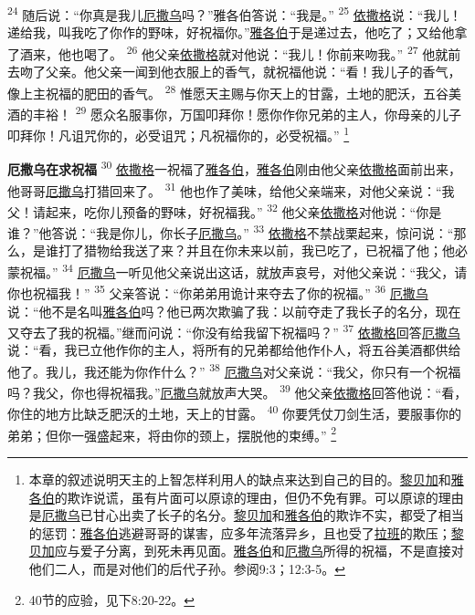 \textsuperscript{24}
随后说：“你真是我儿\uline{厄撒乌}吗？”雅各伯答说：“我是。”
\textsuperscript{25}
\uline{依撒格}说：“我儿！递给我，叫我吃了你作的野味，好祝福你。”\uline{雅各伯}于是递过去，他吃了；又给他拿了酒来，他也喝了。
\textsuperscript{26}
他父亲\uline{依撒格}就对他说：“我儿！你前来吻我。”
\textsuperscript{27}
他就前去吻了父亲。他父亲一闻到他衣服上的香气，就祝福他说：“看！我儿子的香气，像上主祝福的肥田的香气。
\textsuperscript{28}
惟愿天主赐与你天上的甘露，土地的肥沃，五谷美酒的丰裕！
\textsuperscript{29}
愿众名服事你，万国叩拜你！愿你作你兄弟的主人，你母亲的儿子叩拜你！凡诅咒你的，必受诅咒；凡祝福你的，必受祝福。”
\footnote{本章的叙述说明天主的上智怎样利用人的缺点来达到自己的目的。\uline{黎贝加}和\uline{雅各伯}的欺诈说谎，虽有片面可以原谅的理由，但仍不免有罪。可以原谅的理由是\uline{厄撒乌}已甘心出卖了长子的名分。\uline{黎贝加}和\uline{雅各伯}的欺诈不实，都受了相当的惩罚：\uline{雅各伯}逃避哥哥的谋害，应多年流落异乡，且也受了\uline{拉班}的欺压；\uline{黎贝加}应与爱子分离，到死未再见面。\uline{雅各伯}和\uline{厄撒乌}所得的祝福，不是直接对他们二人，而是对他们的后代子孙。参阅9:3；12:3-5。}

\textbf{厄撒乌在求祝福 }
\textsuperscript{30}
\uline{依撒格}一祝福了\uline{雅各伯}，\uline{雅各伯}刚由他父亲\uline{依撒格}面前出来，他哥哥\uline{厄撒乌}打猎回来了。
\textsuperscript{31}
他也作了美味，给他父亲端来，对他父亲说：“我父！请起来，吃你儿预备的野味，好祝福我。”
\textsuperscript{32}
他父亲\uline{依撒格}对他说：“你是谁？”他答说：“我是你儿，你长子\uline{厄撒乌}。”
\textsuperscript{33}
\uline{依撒格}不禁战栗起来，惊问说：“那么，是谁打了猎物给我送了来？并且在你未来以前，我已吃了，已祝福了他；他必蒙祝福。”
\textsuperscript{34}
\uline{厄撒乌}一听见他父亲说出这话，就放声哀号，对他父亲说：“我父，请你也祝福我！”
\textsuperscript{35}
父亲答说：“你弟弟用诡计来夺去了你的祝福。”
\textsuperscript{36}
\uline{厄撒乌}说：“他不是名叫\uline{雅各伯}吗？他已两次欺骗了我：以前夺走了我长子的名分，现在又夺去了我的祝福。”继而问说：“你没有给我留下祝福吗？”
\textsuperscript{37}
\uline{依撒格}回答\uline{厄撒乌}说：“看，我已立他作你的主人，将所有的兄弟都给他作仆人，将五谷美酒都供给他了。我儿，我还能为你作什么？”
\textsuperscript{38}
\uline{厄撒乌}对父亲说：“我父，你只有一个祝福吗？我父，你也得祝福我。”\uline{厄撒乌}就放声大哭。
\textsuperscript{39}
他父亲\uline{依撒格}回答他说：“看，你住的地方比缺乏肥沃的土地，天上的甘露。
\textsuperscript{40}
你要凭仗刀剑生活，要服事你的弟弟；但你一强盛起来，将由你的颈上，摆脱他的束缚。”
\footnote{40节的应验，见下8:20-22。}

